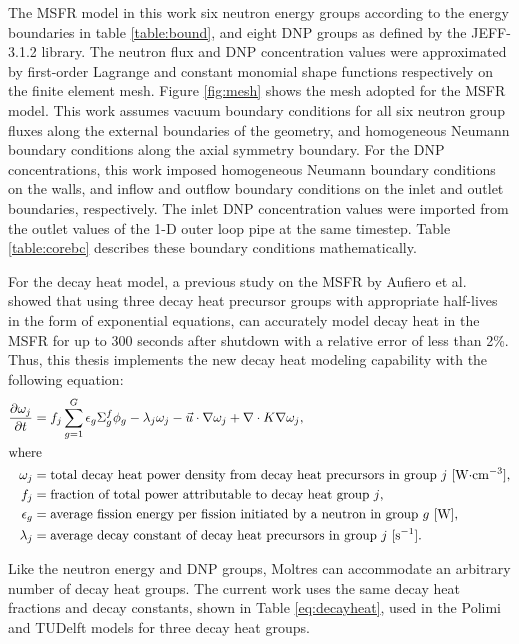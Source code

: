 The \gls{MSFR} model in this work six neutron energy groups according to the
energy boundaries in table \ref{table:bound}, and eight \gls{DNP} groups as
defined by the JEFF-3.1.2 library. The neutron flux
and \gls{DNP} concentration values were approximated by first-order Lagrange
and constant monomial shape functions respectively on the finite element mesh.
Figure \ref{fig:mesh} shows the mesh adopted for the \gls{MSFR} model.
This work assumes vacuum boundary conditions for all six neutron group fluxes
along the external boundaries of the geometry, and homogeneous Neumann
boundary conditions along the axial symmetry boundary. For the \gls{DNP}
concentrations, this work imposed homogeneous Neumann boundary conditions on
the walls, and inflow and outflow boundary conditions on the inlet and outlet
boundaries, respectively. The inlet \gls{DNP} concentration values were
imported from the outlet values of the 1-D outer loop pipe at the same
timestep. Table \ref{table:corebc} describes these boundary conditions
mathematically.

For the decay heat model, a previous study on the MSFR by Aufiero et al.
\cite{aufiero_extended_2013} showed that using three decay heat precursor
groups with appropriate half-lives in the form of exponential equations, can
accurately model decay heat in the MSFR for up to 300 seconds after shutdown
with a relative error of less than 2\%. Thus, this thesis implements the new
decay heat modeling capability with the following equation:
%
\begin{align}
	\frac{\partial \omega_j}{\partial t} &= f_j \sum^G_{g=1} \epsilon_{g}
	\Sigma^f_{g} \phi_{g} - \lambda_j \omega_j - \vec{u} \cdot \nabla
	\omega_j + \nabla \cdot K \nabla \omega_j, \label{eq:decayheat} \\
	\intertext{where}
    \omega_j &= \text{total decay heat power density from decay heat
    precursors in group $j$ [W$\cdot$cm$^{-3}$],} \nonumber \\
	f_j &= \text{fraction of total power attributable to decay heat group
	$j$,} \nonumber \\
	\epsilon_g &= \text{average fission energy per fission initiated by a
	neutron in group $g$ [W],} \nonumber \\
	\lambda_j &= \text{average decay constant of decay heat precursors in
	group $j$ [s$^{-1}$].} \nonumber
\end{align}

Like the neutron energy and \gls{DNP} groups, Moltres can accommodate an
arbitrary number of decay heat groups. The current work uses the same decay
heat fractions and decay constants, shown in Table \ref{eq:decayheat}, used in
the Polimi and TUDelft models for three decay heat groups.

